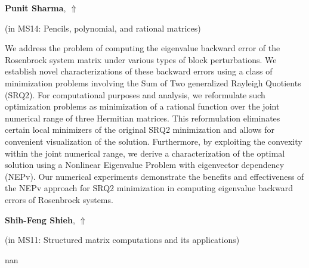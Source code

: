 \documentclass[ILAS2025-program.tex]{subfiles}
\begin{document}
\hypertarget{down0215}{}\begin{ilasabstract}
    
\textbf{Punit Sharma},  \hfill \hyperlink{up0215}{$\Uparrow$}
    
    
(in {\color{mstitle}MS14: Pencils, polynomial, and rational matrices})
        
\mtskip
    We address the problem of computing the eigenvalue backward error
of the Rosenbrock system matrix under various types of block perturbations.
We establish novel characterizations of these backward errors 
using a class of minimization problems involving the 
Sum of Two generalized Rayleigh Quotients (SRQ2). 
%
For computational purposes and analysis, we reformulate such optimization problems 
as minimization of a rational function over the
joint numerical range of three Hermitian matrices. 
%
This reformulation eliminates certain local minimizers of the
original SRQ2 minimization and allows for 
convenient visualization of the solution.
%
Furthermore, by exploiting the convexity within the joint numerical range,
we derive a characterization of the optimal solution %
using a Nonlinear Eigenvalue Problem with eigenvector dependency (NEPv).
%
Our numerical experiments demonstrate the benefits and effectiveness of 
the NEPv approach for SRQ2 minimization in computing eigenvalue backward
errors of Rosenbrock systems.
\end{ilasabstract}
    

\hypertarget{down0233}{}\begin{ilasabstract}
    
\textbf{Shih-Feng Shieh},  \hfill \hyperlink{up0233}{$\Uparrow$}
    
    
(in {\color{mstitle}MS11: Structured matrix computations and its applications})
        
\mtskip
    nan
\end{ilasabstract}
    
\end{document}
